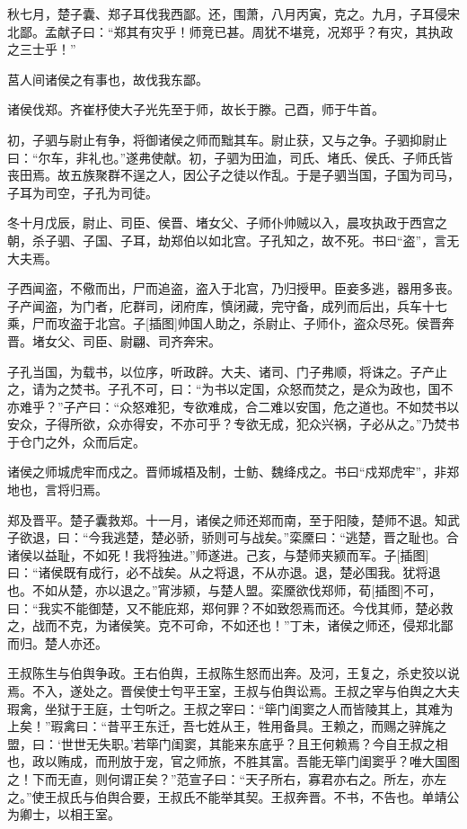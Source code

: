 \documentclass[a4paper,12pt,UTF8,twoside]{ctexbook}
\begin{document}
秋七月，楚子囊、郑子耳伐我西鄙。还，围萧，八月丙寅，克之。九月，子耳侵宋北鄙。孟献子曰：“郑其有灾乎！师竞已甚。周犹不堪竞，况郑乎？有灾，其执政之三士乎！”

莒人间诸侯之有事也，故伐我东鄙。

诸侯伐郑。齐崔杼使大子光先至于师，故长于滕。己酉，师于牛首。

初，子驷与尉止有争，将御诸侯之师而黜其车。尉止获，又与之争。子驷抑尉止曰：“尔车，非礼也。”遂弗使献。初，子驷为田洫，司氏、堵氏、侯氏、子师氏皆丧田焉。故五族聚群不逞之人，因公子之徒以作乱。于是子驷当国，子国为司马，子耳为司空，子孔为司徒。

冬十月戊辰，尉止、司臣、侯晋、堵女父、子师仆帅贼以入，晨攻执政于西宫之朝，杀子驷、子国、子耳，劫郑伯以如北宫。子孔知之，故不死。书曰“盗”，言无大夫焉。

子西闻盗，不儆而出，尸而追盗，盗入于北宫，乃归授甲。臣妾多逃，器用多丧。子产闻盗，为门者，庀群司，闭府库，慎闭藏，完守备，成列而后出，兵车十七乘，尸而攻盗于北宫。子[插图]帅国人助之，杀尉止、子师仆，盗众尽死。侯晋奔晋。堵女父、司臣、尉翩、司齐奔宋。

子孔当国，为载书，以位序，听政辟。大夫、诸司、门子弗顺，将诛之。子产止之，请为之焚书。子孔不可，曰：“为书以定国，众怒而焚之，是众为政也，国不亦难乎？”子产曰：“众怒难犯，专欲难成，合二难以安国，危之道也。不如焚书以安众，子得所欲，众亦得安，不亦可乎？专欲无成，犯众兴祸，子必从之。”乃焚书于仓门之外，众而后定。

诸侯之师城虎牢而戍之。晋师城梧及制，士鲂、魏绛戍之。书曰“戍郑虎牢”，非郑地也，言将归焉。

郑及晋平。楚子囊救郑。十一月，诸侯之师还郑而南，至于阳陵，楚师不退。知武子欲退，曰：“今我逃楚，楚必骄，骄则可与战矣。”栾黡曰：“逃楚，晋之耻也。合诸侯以益耻，不如死！我将独进。”师遂进。己亥，与楚师夹颍而军。子[插图]曰：“诸侯既有成行，必不战矣。从之将退，不从亦退。退，楚必围我。犹将退也。不如从楚，亦以退之。”宵涉颍，与楚人盟。栾黡欲伐郑师，荀[插图]不可，曰：“我实不能御楚，又不能庇郑，郑何罪？不如致怨焉而还。今伐其师，楚必救之，战而不克，为诸侯笑。克不可命，不如还也！”丁未，诸侯之师还，侵郑北鄙而归。楚人亦还。

王叔陈生与伯舆争政。王右伯舆，王叔陈生怒而出奔。及河，王复之，杀史狡以说焉。不入，遂处之。晋侯使士匄平王室，王叔与伯舆讼焉。王叔之宰与伯舆之大夫瑕禽，坐狱于王庭，士匄听之。王叔之宰曰：“筚门闺窦之人而皆陵其上，其难为上矣！”瑕禽曰：“昔平王东迁，吾七姓从王，牲用备具。王赖之，而赐之骍旄之盟，曰：‘世世无失职。’若筚门闺窦，其能来东底乎？且王何赖焉？今自王叔之相也，政以贿成，而刑放于宠，官之师旅，不胜其富。吾能无筚门闺窦乎？唯大国图之！下而无直，则何谓正矣？”范宣子曰：“天子所右，寡君亦右之。所左，亦左之。”使王叔氏与伯舆合要，王叔氏不能举其契。王叔奔晋。不书，不告也。单靖公为卿士，以相王室。
\end{document}
